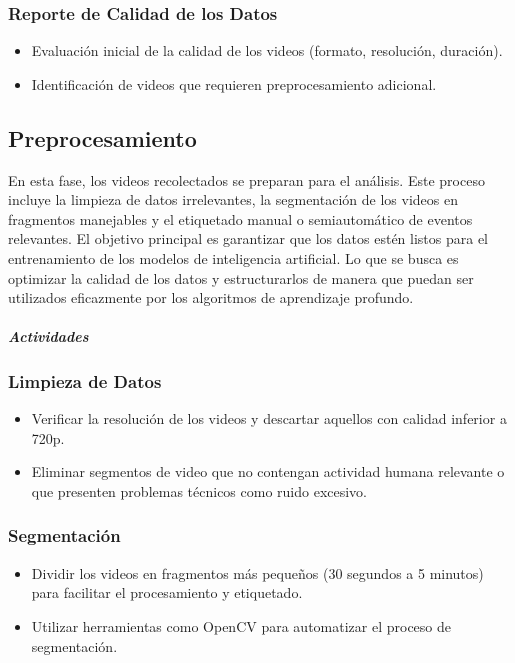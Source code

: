 \subsubsection{Reporte de Calidad de los Datos}
\begin{itemize}
    \item Evaluación inicial de la calidad de los videos (formato, resolución, duración).
    \item Identificación de videos que requieren preprocesamiento adicional.
\end{itemize}



\subsection{Preprocesamiento}
En esta fase, los videos recolectados se preparan para el análisis. Este proceso incluye la limpieza de datos irrelevantes, la segmentación de los videos en fragmentos manejables y el etiquetado manual o semiautomático de eventos relevantes. El objetivo principal es garantizar que los datos estén listos para el entrenamiento de los modelos de inteligencia artificial.
Lo que se busca es optimizar la calidad de los datos y estructurarlos de manera que puedan ser utilizados eficazmente por los algoritmos de aprendizaje profundo.

\paragraph{\textit{Actividades}}

\subsubsection{Limpieza de Datos}

\begin{itemize}
    \item Verificar la resolución de los videos y descartar aquellos con calidad inferior a 720p.
    \item Eliminar segmentos de video que no contengan actividad humana relevante o que presenten problemas técnicos como ruido excesivo.
\end{itemize}


\subsubsection{Segmentación}
\begin{itemize}
    \item Dividir los videos en fragmentos más pequeños (30 segundos a 5 minutos) para facilitar el procesamiento y etiquetado.
    \item Utilizar herramientas como OpenCV para automatizar el proceso de segmentación.
\end{itemize}

